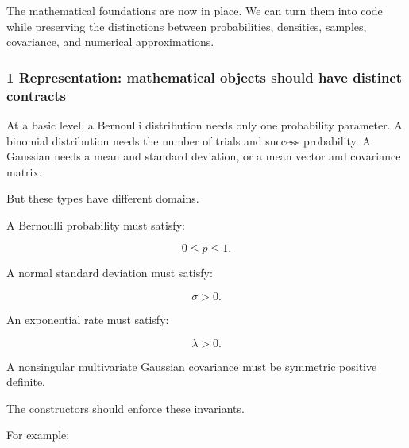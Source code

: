 The mathematical foundations are now in place. We can turn them into code while preserving the distinctions between probabilities, densities, samples, covariance, and numerical approximations.

\subsubsection{1 Representation: mathematical objects should have distinct contracts}\label{02-foundations-ii-ch031-representation-mathematical-objects-should-have-distinct-contracts}

\hypertarget{02-foundations-ii-ch031-representation-mathematical-objects-should-have-distinct-contracts}{}

At a basic level, a Bernoulli distribution needs only one probability parameter. A binomial distribution needs the number of trials and success probability. A Gaussian needs a mean and standard deviation, or a mean vector and covariance matrix.

But these types have different domains.

A Bernoulli probability must satisfy:

\[
 0\le p\le1.
\]

A normal standard deviation must satisfy:

\[
 \sigma>0.
\]

An exponential rate must satisfy:

\[
 \lambda>0.
\]

A nonsingular multivariate Gaussian covariance must be symmetric positive definite.

The constructors should enforce these invariants.

For example:

